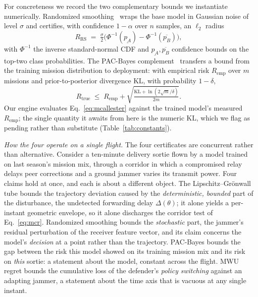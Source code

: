 For concreteness we record the two complementary bounds we instantiate
numerically. Randomized smoothing~\cite{cohen2019smoothing} wraps the base model
in Gaussian noise of level $\sigma$ and certifies, with confidence $1-\alpha$
over $n$ samples, an $\ell_2$ radius
\begin{equation}
\label{eq:cohen}
R_{\mathrm{RS}} \;=\; \tfrac{\sigma}{2}\big(\Phi^{-1}(\underline{p_A})-\Phi^{-1}(\overline{p_B})\big),
\end{equation}
with $\Phi^{-1}$ the inverse standard-normal CDF and
$\underline{p_A},\overline{p_B}$ confidence bounds on the top-two class
probabilities. The PAC-Bayes
complement~\cite{mcallester1999pac,viallard2021pacbayes} transfers a bound from
the training mission distribution to deployment: with empirical risk
$R_{\mathrm{emp}}$ over $m$ missions and prior-to-posterior divergence
$\mathrm{KL}$, with probability $1-\delta$,
\begin{equation}
\label{eq:mcallester}
R_{\mathrm{true}} \;\le\; R_{\mathrm{emp}} + \sqrt{\tfrac{\mathrm{KL}+\ln(2\sqrt{m}/\delta)}{2m}}.
\end{equation}
Our engine evaluates Eq.~\eqref{eq:mcallester} against the trained model's measured
$R_{\mathrm{emp}}$; the single quantity it awaits from here is the numeric $\mathrm{KL}$,
which we flag as pending rather than substitute (Table~\ref{tab:constants}).


\emph{How the four operate on a single flight.} The four certificates are
concurrent rather than alternative. Consider a ten-minute delivery sortie flown
by a model trained on last season's mission mix, through a corridor in which a
compromised relay delays peer corrections and a ground jammer varies its
transmit power. Four claims hold at once, and each is about a different object.
The Lipschitz--Gr\"onwall tube bounds the trajectory deviation caused by the
\emph{deterministic, bounded} part of the disturbance, the undetected forwarding
delay $\Delta(\theta)$; it alone yields a per-instant geometric envelope, so it
alone discharges the corridor test of Eq.~\eqref{eq:mcr}. Randomized smoothing
bounds the \emph{stochastic} part, the jammer's residual perturbation of the
receiver feature vector, and its claim concerns the model's \emph{decision} at a
point rather than the trajectory. PAC-Bayes bounds the gap between the risk this
model showed on its training mission mix and its risk on \emph{this} sortie: a
statement about the model, constant across the flight. MWU regret bounds the
cumulative loss of the defender's \emph{policy switching} against an adapting
jammer, a statement about the time axis that is vacuous at any single instant.

